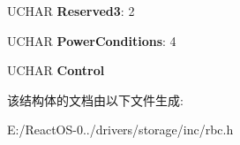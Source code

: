 \begin{DoxyCompactItemize}
\item 
\mbox{\label{struct___c_d_b___r_b_c_1_1___s_t_a_r_t___s_t_o_p___r_b_c_aaa5079b049fca8bded492f4603e5dc25}} 
U\+C\+H\+AR {\bfseries Reserved3}\+: 2
\item 
\mbox{\label{struct___c_d_b___r_b_c_1_1___s_t_a_r_t___s_t_o_p___r_b_c_a794aed27c3f87cf669a512b7a2b50b4c}} 
U\+C\+H\+AR {\bfseries Power\+Conditions}\+: 4
\item 
\mbox{\label{struct___c_d_b___r_b_c_1_1___s_t_a_r_t___s_t_o_p___r_b_c_a2488680d361739830bac0bad12652558}} 
U\+C\+H\+AR {\bfseries Control}
\end{DoxyCompactItemize}


该结构体的文档由以下文件生成\+:\begin{DoxyCompactItemize}
\item 
E\+:/\+React\+O\+S-\/0../drivers/storage/inc/rbc.\+h\end{DoxyCompactItemize}
